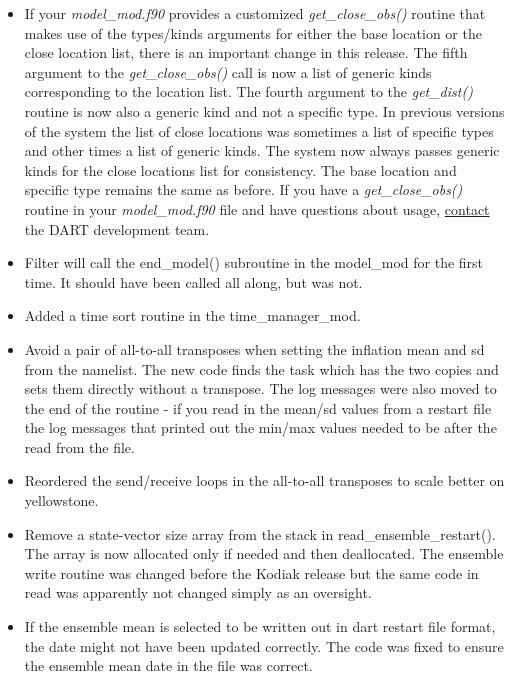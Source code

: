 \documentclass[letterpaper,10pt,english]{sphinxmanual}
\begin{document}
\begin{itemize}
\item {} 
If your \emph{model\_mod.f90} provides a customized \emph{get\_close\_obs()}
routine that makes use of the types/kinds arguments for either the
base location or the close location list, there is an important
change in this release. The fifth argument to the
\emph{get\_close\_obs()} call is now a list of generic kinds
corresponding to the location list. The fourth argument to the
\emph{get\_dist()} routine is now also a generic kind and not a specific
type. In previous versions of the system the list of close locations
was sometimes a list of specific types and other times a list of
generic kinds. The system now always passes generic kinds for the
close locations list for consistency. The base location and specific
type remains the same as before. If you have a \emph{get\_close\_obs()}
routine in your \emph{model\_mod.f90} file and have questions about
usage, \href{mailto:dart@ucar.edu}{contact} the DART development team.

\item {} 
Filter will call the end\_model() subroutine in the model\_mod for
the first time. It should have been called all along, but was not.

\item {} 
Added a time sort routine in the time\_manager\_mod.

\item {} 
Avoid a pair of all-to-all transposes when setting the inflation
mean and sd from the namelist. The new code finds the task which has
the two copies and sets them directly without a transpose. The log
messages were also moved to the end of the routine - if you read in
the mean/sd values from a restart file the log messages that printed
out the min/max values needed to be after the read from the file.

\item {} 
Reordered the send/receive loops in the all-to-all transposes to
scale better on yellowstone.

\item {} 
Remove a state-vector size array from the stack in
read\_ensemble\_restart(). The array is now allocated only if needed
and then deallocated. The ensemble write routine was changed before
the Kodiak release but the same code in read was apparently not
changed simply as an oversight.

\item {} 
If the ensemble mean is selected to be written out in dart restart
file format, the date might not have been updated correctly. The
code was fixed to ensure the ensemble mean date in the file was
correct.


\end{itemize}
\end{document}
